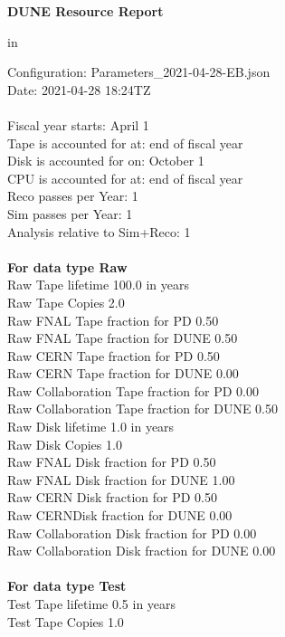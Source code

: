 \documentclass[12pt]{article}
\begin{document}
\parindent=0pt
\setlength{\textwidth=7.0 in}
\setlength{\oddsidemargin=0.00 in}
\setlength{\topmargin=0 in}
\setlength{\textheight=9.5 in}
\centerline{\bf{DUNE Resource Report}} in \par Configuration: Parameters\_2021-04-28-EB.json\\  Date: 2021-04-28 18:24TZ\\   \\  Fiscal year starts: April 1\\ 
Tape is accounted for at: end of fiscal year\\ 
Disk is accounted for on: October 1\\ 
CPU is accounted for at: end of fiscal year\\ 
Reco passes per Year: 1\\
Sim passes per Year: 1\\
Analysis relative to Sim+Reco: 1\\
\pagebreak
\\
{\bf For data type Raw}\\
   Raw Tape lifetime 100.0 in years\\
   Raw Tape Copies   2.0\\
   Raw FNAL Tape fraction for PD  0.50\\
   Raw FNAL Tape fraction for DUNE  0.50\\
   Raw CERN Tape fraction for PD  0.50\\
   Raw CERN Tape fraction for DUNE  0.00\\
   Raw Collaboration Tape fraction for PD  0.00\\
   Raw Collaboration Tape fraction for DUNE  0.50\\
   Raw Disk lifetime   1.0 in years\\
   Raw Disk Copies   1.0\\
   Raw FNAL Disk fraction for PD  0.50\\
   Raw FNAL Disk fraction for DUNE  1.00\\
   Raw CERN Disk fraction for PD  0.50\\
   Raw CERNDisk fraction for DUNE  0.00\\
   Raw Collaboration Disk fraction for PD  0.00\\
   Raw Collaboration Disk fraction for DUNE  0.00\\
\\
{\bf For data type Test}\\
  Test Tape lifetime   0.5 in years\\
  Test Tape Copies   1.0\\
\end{document}
